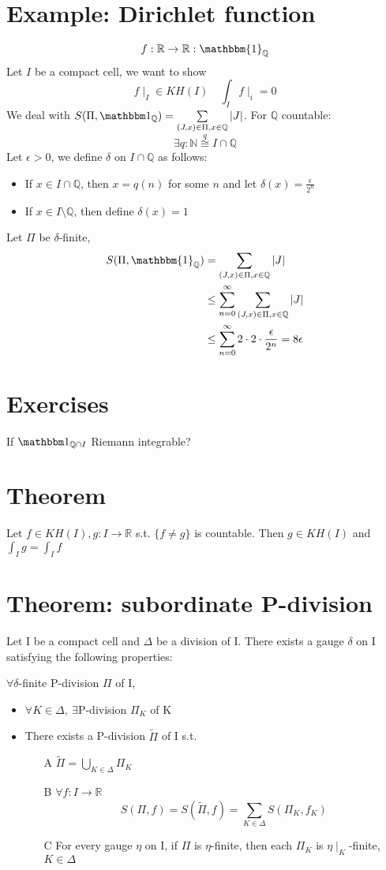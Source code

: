 \documentclass{book}
\newcommand{\abs}[1]{\left\lvert #1 \right\rvert}
\begin{document}
\section{Example: Dirichlet function}
$$f:\mathbb R\rightarrow\mathbb R:\mathbbm{1}_{\mathbb Q}$$
Let $I$ be a compact cell, we want to show
$$f\mid_I\in KH(I)\quad\int_If\mid_i=0$$
We deal with $S(\Pi,\mathbbm 1_{\mathbb Q})=\sum\limits_{(J,x)\in \Pi,x\in \mathbb Q}\abs{J}$. For $\mathbb Q$ countable:
$$\exists q:\mathbb N\stackrel{q}{\cong}I\cap \mathbb Q$$
Let $\epsilon>0$, we define $\delta$ on $I\cap\mathbb Q$ as follows:\begin{itemize}
    \item If $x\in I\cap \mathbb Q$, then $x=q(n)$ for some $n$ and let $\delta(x)=\frac{\epsilon}{2^n}$
    \item If $x\in I\setminus\mathbb Q$, then define $\delta(x)=1$
\end{itemize}
Let $\Pi$ be $\delta$-finite,
$$\begin{aligned}
    S(\Pi,\mathbbm{1}_{\mathbb Q})&=\sum\limits_{(J,x)\in \Pi,x\in \mathbb Q}\abs{J}\\
    &\leq\sum\limits_{n=0}^\infty\sum\limits_{(J,x)\in \Pi,x\in \mathbb Q}\abs J\\
    &\leq \sum\limits_{n=0}^\infty2\cdot2\cdot\frac{\epsilon}{2^n}=8\epsilon
\end{aligned}$$
\section*{Exercises}
If $\mathbbm 1_{\mathbb Q\cap I}$ Riemann integrable?
\section{Theorem}
Let $f\in KH(I),g:I\rightarrow\mathbb R$ s.t. $\{f\neq g\}$ is countable. Then $g\in KH(I)$ and $\int_Ig=\int_If$
\section{Theorem: subordinate P-division}
\label{subordinate P-division theorem}
Let I be a compact cell and $\Delta$ be a division of I. There exists a gauge $\delta$ on I satisfying the following properties:

$\forall \delta$-finite P-division $\Pi$ of I,
\begin{itemize}
    \item $\forall K\in \Delta,\ \exists$P-division $\Pi_K$ of K
    \item There exists a P-division $\tilde\Pi$ of I s.t.\begin{itemize}
        \item [A]$\tilde{\Pi}=\bigcup\limits_{K\in \Delta}\Pi_K$
        \item [B]$\forall f:I\rightarrow\mathbb R$$$S(\Pi,f)=S(\tilde\Pi,f)=\sum\limits_{K\in \Delta}S(\Pi_K,f_K)$$
        \item [C]For every gauge $\eta$ on I, if $\Pi$ is $\eta$-finite, then each $\Pi_K$ is $\eta\mid_K$-finite, $K\in \Delta$
    \end{itemize}
\end{itemize}
\end{document}
